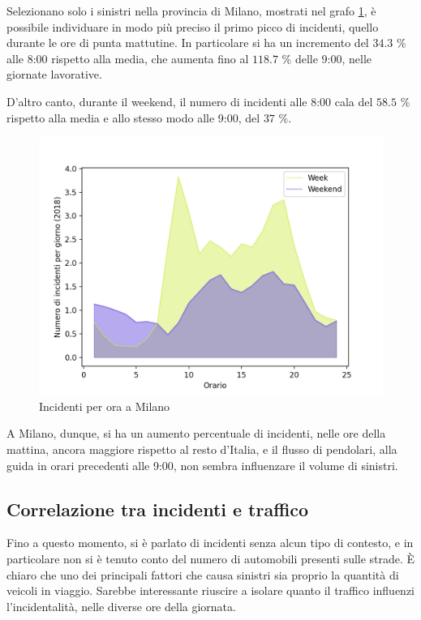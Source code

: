 \documentclass[a4paper,12pt]{report}
\begin{document}
Selezionano solo i sinistri nella provincia di Milano, mostrati nel grafo 
\ref{fig:week-weekend-milano}, è possibile individuare in modo più preciso
il primo picco di incidenti, quello durante le ore di punta mattutine. 
In particolare si ha un incremento del $34.3$ \% alle 8:00 rispetto alla media, 
che aumenta fino al $118.7$ \% delle 9:00, nelle giornate lavorative. 

D'altro canto, durante il weekend, il numero di incidenti alle 8:00 cala del $58.5$ \% rispetto 
alla media e allo stesso modo alle 9:00, del $37$ \%. 

\begin{figure}
    \includegraphics[width=\linewidth]{../src/incidenti/incidenti_senza_coords/ore_punta/week_weekend_milano.png}
    \caption{Incidenti per ora a Milano}
    \label{fig:week-weekend-milano}
\end{figure}

A Milano, dunque, si ha un aumento percentuale di incidenti, nelle ore della mattina, 
ancora maggiore rispetto al resto d'Italia, e il flusso di pendolari, 
alla guida in orari precedenti alle 9:00, 
non sembra influenzare il volume di sinistri. 

\subsection{Correlazione tra incidenti e traffico}

Fino a questo momento, si è parlato di incidenti senza alcun tipo di contesto, 
e in 
particolare non si è tenuto conto del numero di automobili presenti sulle strade. 
\`E chiaro che uno dei principali fattori che causa sinistri sia proprio 
la quantità di veicoli in viaggio. 
Sarebbe interessante riuscire a isolare quanto 
il traffico influenzi l'incidentalità, nelle diverse ore della giornata. 
\end{document}
